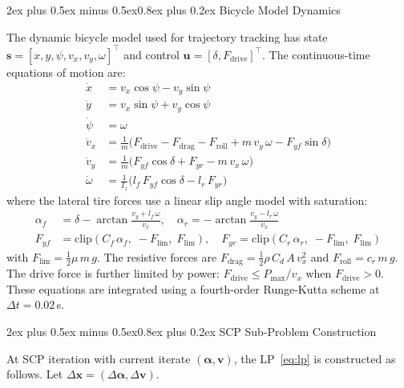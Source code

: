 \documentclass[conf]{new-aiaa}
\makeatletter
\renewcommand\section{\@startsection{section}{1}{\z@}%
  {2ex plus 0.5ex minus 0.5ex}{0.8ex plus 0.2ex}%
  {\normalfont\large\bfseries\centering}}
\makeatother
\begin{document}
\section{Bicycle Model Dynamics}\label{app:dynamics}

The dynamic bicycle model used for trajectory tracking has state
$\mathbf{s} = [x, y, \psi, v_x, v_y, \omega]^\top$ and control
$\mathbf{u} = [\delta, F_{\text{drive}}]^\top$. The continuous-time equations of motion are:
\begin{align}
  \dot{x} &= v_x \cos\psi - v_y \sin\psi \\
  \dot{y} &= v_x \sin\psi + v_y \cos\psi \\
  \dot{\psi} &= \omega \\
  \dot{v}_x &= \frac{1}{m}\bigl(F_{\text{drive}} - F_{\text{drag}} - F_{\text{roll}}
               + m\,v_y\,\omega - F_{yf}\sin\delta\bigr) \\
  \dot{v}_y &= \frac{1}{m}\bigl(F_{yf}\cos\delta + F_{yr} - m\,v_x\,\omega\bigr) \\
  \dot{\omega} &= \frac{1}{I_z}\bigl(l_f\,F_{yf}\cos\delta - l_r\,F_{yr}\bigr)
\end{align}
where the lateral tire forces use a linear slip angle model with saturation:
\begin{align}
  \alpha_f &= \delta - \arctan\!\frac{v_y + l_f\,\omega}{v_x}, \quad
  \alpha_r = -\arctan\!\frac{v_y - l_r\,\omega}{v_x} \\
  F_{yf} &= \text{clip}(C_f\,\alpha_f,\; -F_{\text{lim}},\; F_{\text{lim}}), \quad
  F_{yr} = \text{clip}(C_r\,\alpha_r,\; -F_{\text{lim}},\; F_{\text{lim}})
\end{align}
with $F_{\text{lim}} = \tfrac{1}{2}\mu\,m\,g$. The resistive forces are
$F_{\text{drag}} = \tfrac{1}{2}\rho\,C_d\,A\,v_x^2$ and $F_{\text{roll}} = c_r\,m\,g$.
The drive force is further limited by power: $F_{\text{drive}} \leq P_{\max}/v_x$ when
$F_{\text{drive}} > 0$. These equations are integrated using a fourth-order Runge-Kutta scheme
at $\Delta t = 0.02$\,s.

\section{SCP Sub-Problem Construction}\label{app:scp}

At SCP iteration with current iterate $(\boldsymbol{\alpha}, \mathbf{v})$, the LP~\eqref{eq:lp}
is constructed as follows. Let $\Delta\mathbf{x} = (\Delta\boldsymbol{\alpha}, \Delta\mathbf{v})$.
\end{document}
